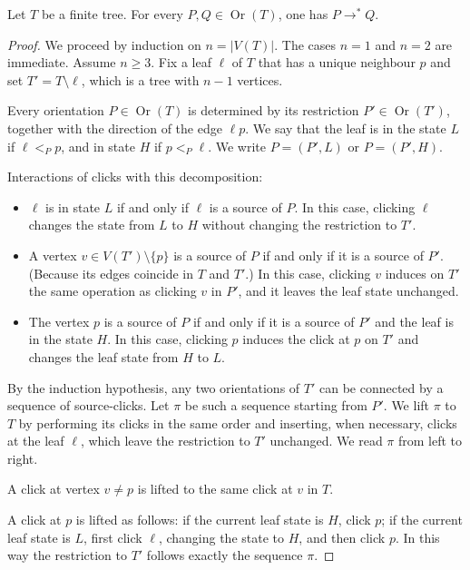 \begin{proposition}%
\label{Transitivity of clicks on a tree}
    Let $T$ be a finite tree. For every $P,Q \in \operatorname{Or}(T)$, one has $P \to^*Q$.
\end{proposition}
\begin{proof}
    We proceed by induction on $n=|V(T)|$. The cases $n=1$ and $n=2$ are immediate. Assume $n \geq 3$. Fix a leaf $\ell$ of $T$ that has a unique neighbour $p$ and set $T'=T\setminus\ell$, which is a tree with $n-1$ vertices.

    Every orientation $P \in \operatorname{Or}(T)$ is determined by its restriction $P' \in \operatorname{Or}(T')$, together with the direction of the edge $\ell p$. We say that the leaf is in the state $L$ if $\ell <_Pp$, and in state $H$ if $p<_P\ell$. We write $P=(P',L)$ or $P=(P',H)$.

    Interactions of clicks with this decomposition:
    \begin{itemize}
        \item $\ell$ is in state $L$ if and only if $\ell$ is a source of $P$. In this case, clicking $\ell$ changes the state from $L$ to $H$ without changing the restriction to $T'$.
        \item A vertex $v\in V(T') \setminus \{p\}$ is a source of $P$ if and only if it is a source of $P'$. (Because its edges coincide in $T$ and $T'$.) In this case, clicking $v$ induces on $T'$ the same operation as clicking $v$ in $P'$, and it leaves the leaf state unchanged.
        \item The vertex $p$ is a source of $P$ if and only if it is a source of $P'$ and the leaf is in the state $H$. In this case, clicking $p$ induces the click at $p$ on $T'$ and changes the leaf state from $H$ to $L$.
    \end{itemize}

By the induction hypothesis, any two orientations of $T'$ can be connected by a sequence of source-clicks. Let $\pi$ be such a sequence starting from $P'$. We lift $\pi$ to $T$ by performing its clicks in the same order and inserting, when necessary, clicks at the leaf $\ell$, which leave the restriction to $T'$ unchanged. We read $\pi$ from left to right. 

A click at vertex $v \neq p$ is lifted to the same click at $v$ in $T$. 

A click at $p$ is lifted as follows: if the current leaf state is $H$, click $p$; if the current leaf state is $L$, first click $\ell$, changing the state to $H$, and then click $p$. In this way the restriction to $T'$ follows exactly the sequence $\pi$.


\end{proof}
